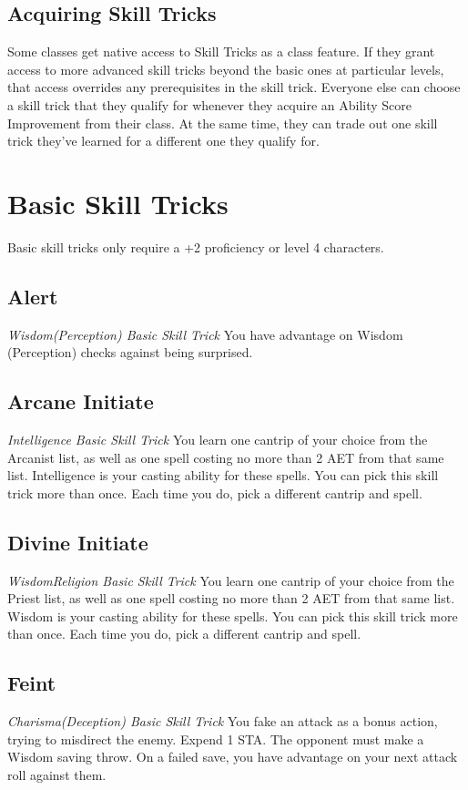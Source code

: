\subsection{Acquiring Skill Tricks}
\label{subsec:acquiring-skill-tricks}

Some classes get native access to Skill Tricks as a class feature. If they grant access to more advanced skill tricks beyond the basic ones at particular levels, that access overrides any prerequisites in the skill trick. Everyone else can choose a skill trick that they qualify for whenever they acquire an Ability Score Improvement from their class. At the same time, they can trade out one skill trick they've learned for a different one they qualify for.

\section{Basic Skill Tricks}
\label{sec:skill-tricks-basic}

Basic skill tricks only require a +2 proficiency or level 4 characters.

\subsection{Alert}
\textit{Wisdom(Perception) Basic Skill Trick}
You have advantage on Wisdom (Perception) checks against being surprised.

\subsection{Arcane Initiate}
\textit{Intelligence Basic Skill Trick}
You learn one cantrip of your choice from the Arcanist list, as well as one spell costing no more than 2 AET from that same list. Intelligence is your casting ability for these spells. You can pick this skill trick more than once. Each time you do, pick a different cantrip and spell.

\subsection{Divine Initiate}
\textit{Wisdom{Religion} Basic Skill Trick}
You learn one cantrip of your choice from the Priest list, as well as one spell costing no more than 2 AET from that same list. Wisdom is your casting ability for these spells. You can pick this skill trick more than once. Each time you do, pick a different cantrip and spell.

\subsection{Feint}
\textit{Charisma(Deception) Basic Skill Trick}
You fake an attack as a bonus action, trying to misdirect the enemy. Expend 1 STA. The opponent must make a Wisdom saving throw. On a failed save, you have advantage on your next attack roll against them.

